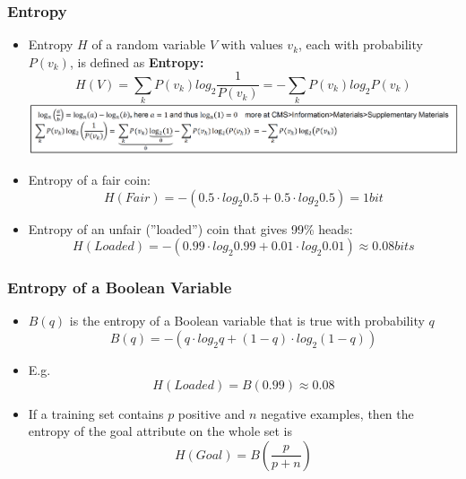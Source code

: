 \documentclass[conference, a4paper]{styles/acmsiggraph}
\begin{document}
        \subsubsection{Entropy}
            \begin{itemize}
                \item Entropy $H$ of a random variable $V$ with values $v_k$, each with probability $P(v_k)$, is defined as\newline
                \textbf{Entropy:} 
                $$H(V) = \sum\limits_{k} P(v_k) log_2 \frac{1}{P(v_k)} = - \sum\limits_{k} P(v_k) log_2 P(v_k)$$
                \includegraphics[width=1\textwidth]{imgs/Entropy.png}
                \item Entropy of a fair coin:
                $$H(Fair) = -(0.5 \cdot log_2 0.5 + 0.5 \cdot log_2 0.5) = 1 bit$$
                \item Entropy of an unfair (''loaded'') coin that gives 99\% heads:
                $$H(Loaded) = -(0.99 \cdot log_2 0.99 + 0.01 \cdot log_2 0.01) \approx 0.08 bits$$
            \end{itemize}
        
        \subsubsection{Entropy of a Boolean Variable}
            \begin{itemize}
                \item $B(q)$ is the entropy of a Boolean variable that is true with probability $q$
                $$B(q) = -(q \cdot log_2 q + (1-q) \cdot log_2 (1-q))$$
                \item E.g.
                $$H(Loaded) = B(0.99) \approx 0.08$$
\newpage
                \item If a training set contains $p$ positive and $n$ negative examples, then the entropy of the goal attribute on the whole set is
                $$H(Goal) = B \left(\frac{p}{p+n}\right)$$
            \end{itemize}
        
\end{document}
